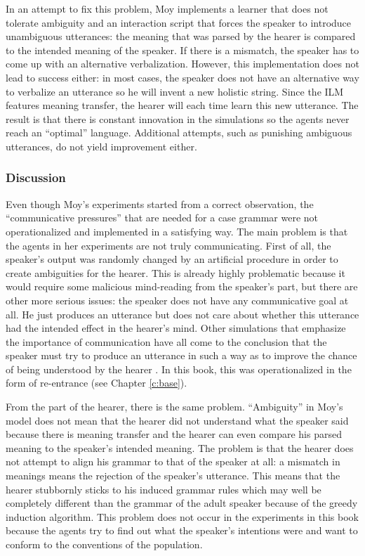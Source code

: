 In an attempt to fix this problem, Moy implements a learner that does not tolerate ambiguity and an interaction script that forces the speaker to introduce unambiguous utterances: the meaning that was parsed by the hearer is compared to the intended meaning of the speaker. If there is a mismatch, the speaker has to come up with an alternative verbalization. However, this implementation does not lead to success either: in most cases, the speaker does not have an alternative way to verbalize an utterance so he will invent a new holistic string. Since the ILM features meaning transfer, the hearer will each time learn this new utterance. The result is that there is constant innovation in the simulations so the agents never reach an ``optimal'' language. Additional attempts, such as punishing ambiguous utterances, do not yield improvement either.


\subsubsection{Discussion}
Even though Moy's experiments started from a correct observation, the ``communicative pressures'' that are needed for a case grammar were not operationalized and implemented in a satisfying way. The main problem is that the agents in her experiments are not truly communicating. First of all, the speaker's output was randomly changed by an artificial procedure in order to create ambiguities for the hearer. This is already highly problematic because it would require some malicious mind-reading from the speaker's part, but there are other more serious issues: the speaker does not have any communicative goal at all. He just produces an utterance but does not care about whether this utterance had the intended effect in the hearer's mind. Other simulations that emphasize the importance of communication have all come to the conclusion that the speaker must try to produce an utterance in such a way as to improve the chance of being understood by the hearer \citep{smith03intelligent, steels03language}. In this book, this was operationalized in the form of re-entrance (see Chapter \ref{c:base}).

From the part of the hearer, there is the same problem. ``Ambiguity'' in Moy's model does not mean that the hearer did not understand what the speaker said because there is meaning transfer and the hearer can even compare his parsed meaning to the speaker's intended meaning. The problem is that the hearer does not attempt to align his grammar to that of the speaker at all: a mismatch in meanings means the rejection of the speaker's utterance. This means that the hearer stubbornly sticks to his induced grammar rules which may well be completely different than the grammar of the adult speaker because of the greedy induction algorithm. This problem does not occur in the experiments in this book because the agents try to find out what the speaker's intentions were and want to conform to the conventions of the population.


